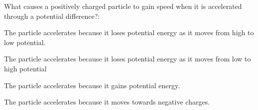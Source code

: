 \begin{checkpoint}
	\begin{MCquestion}{What causes a positively charged particle to gain speed when it is accelerated through a potential difference?:}
		\item The particle accelerates because it loses potential energy as it moves from high to low potential. \correct
		\item The particle accelerates because it loses potential energy as it moves from low to high potential
		\item The particle accelerates because it gains potential energy.
		\item The particle accelerates because it moves towards negative charges.
	\end{MCquestion}
\end{checkpoint}
\vspace{-0.25cm}
